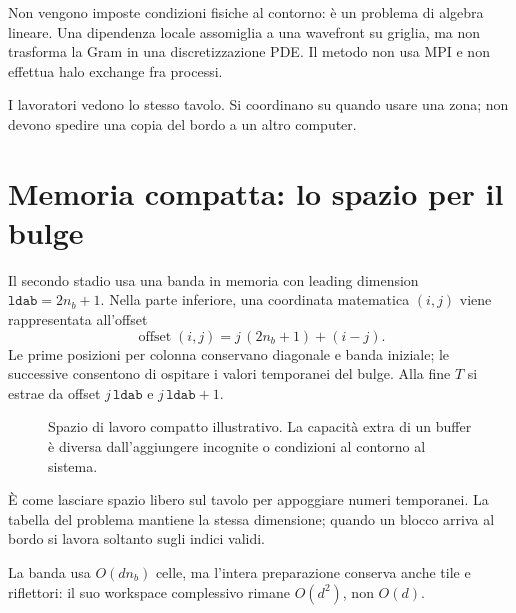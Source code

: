 \documentclass[11pt,a4paper]{article}
\newcommand{\semplice}[1]{\begin{idea}[title=In parole semplici]#1\end{idea}}
\newcommand{\page}[1]{\clearpage\section{#1}}
\begin{document}
Non vengono imposte condizioni fisiche al contorno: è un problema di algebra
lineare. Una dipendenza locale assomiglia a una wavefront su griglia,
ma non trasforma la Gram in una discretizzazione PDE. Il metodo non usa
MPI e non effettua halo exchange fra processi.
\semplice{I lavoratori vedono lo stesso tavolo. Si coordinano su quando
usare una zona; non devono spedire una copia del bordo a un altro computer.}
\page{Memoria compatta: lo spazio per il bulge}
Il secondo stadio usa una banda in memoria con leading dimension
$\texttt{ldab}=2n_b+1$. Nella parte inferiore, una coordinata matematica
$(i,j)$ viene rappresentata all'offset
\[
\boxed{\operatorname{offset}(i,j)=j\,(2n_b+1)+(i-j)}.
\]
Le prime posizioni per colonna conservano diagonale e banda iniziale; le
successive consentono di ospitare i valori temporanei del bulge. Alla fine
$T$ si estrae da offset $j\,\texttt{ldab}$ e $j\,\texttt{ldab}+1$.
\begin{figure}[H]\centering
{}
\caption{Spazio di lavoro compatto illustrativo. La capacità extra di un
buffer è diversa dall'aggiungere incognite o condizioni al contorno al sistema.}
\end{figure}
\semplice{È come lasciare spazio libero sul tavolo per appoggiare numeri
temporanei. La tabella del problema mantiene la stessa dimensione; quando
un blocco arriva al bordo si lavora soltanto sugli indici validi.}
La banda usa $O(d n_b)$ celle, ma l'intera preparazione conserva anche tile
e riflettori: il suo workspace complessivo rimane $O(d^2)$, non $O(d)$.
\end{document}
